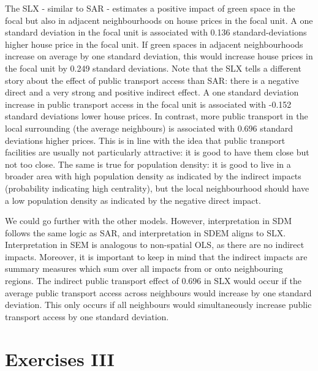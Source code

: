 \documentclass[
  letterpaper,
  DIV=11,
  numbers=noendperiod]{scrreprt}
\begin{document}
The SLX - similar to SAR - estimates a positive impact of green space in
the focal but also in adjacent neighbourhoods on house prices in the
focal unit. A one standard deviation in the focal unit is associated
with 0.136 standard-deviations higher house price in the focal unit. If
green spaces in adjacent neighbourhoods increase on average by one
standard deviation, this would increase house prices in the focal unit
by 0.249 standard deviations. Note that the SLX tells a different story
about the effect of public transport access than SAR: there is a
negative direct and a very strong and positive indirect effect. A one
standard deviation increase in public transport access in the focal unit
is associated with -0.152 standard deviations lower house prices. In
contrast, more public transport in the local surrounding (the average
neighbours) is associated with 0.696 standard deviations higher prices.
This is in line with the idea that public transport facilities are
usually not particularly attractive: it is good to have them close but
not too close. The same is true for population density: it is good to
live in a broader area with high population density as indicated by the
indirect impacts (probability indicating high centrality), but the local
neighbourhood should have a low population density as indicated by the
negative direct impact.

We could go further with the other models. However, interpretation in
SDM follows the same logic as SAR, and interpretation in SDEM aligns to
SLX. Interpretation in SEM is analogous to non-spatial OLS, as there are
no indirect impacts. Moreover, it is important to keep in mind that the
indirect impacts are summary measures which sum over all impacts from or
onto neighbouring regions. The indirect public transport effect of 0.696
in SLX would occur if the average public transport access across
neighbours would increase by one standard deviation. This only occurs if
all neighbours would simultaneously increase public transport access by
one standard deviation.


\hypertarget{exercises-iii}{%
\chapter{Exercises III}\label{exercises-iii}}

\newcommand{\Exp}{\mathrm{E}}
\newcommand\given[1][]{\:#1\vert\:}
\newcommand{\Cov}{\mathrm{Cov}}
\newcommand{\Var}{\mathrm{Var}}
\newcommand{\rank}{\mathrm{rank}}
\newcommand{\bm}[1]{\boldsymbol{\mathbf{#1}}}
\end{document}
